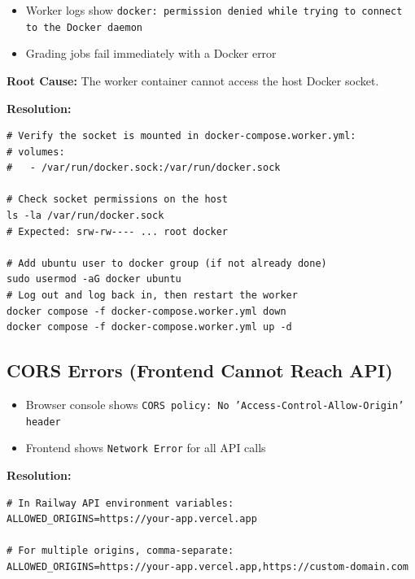 \documentclass[12pt,a4paper]{article}
\begin{document}
\begin{troublebox}[Symptoms]
\begin{itemize}
  \item Worker logs show \texttt{docker: permission denied while trying to connect to the Docker daemon}
  \item Grading jobs fail immediately with a Docker error
\end{itemize}
\end{troublebox}

\textbf{Root Cause:} The worker container cannot access the host Docker socket.

\textbf{Resolution:}

\begin{lstlisting}[style=terminal]
# Verify the socket is mounted in docker-compose.worker.yml:
# volumes:
#   - /var/run/docker.sock:/var/run/docker.sock

# Check socket permissions on the host
ls -la /var/run/docker.sock
# Expected: srw-rw---- ... root docker

# Add ubuntu user to docker group (if not already done)
sudo usermod -aG docker ubuntu
# Log out and log back in, then restart the worker
docker compose -f docker-compose.worker.yml down
docker compose -f docker-compose.worker.yml up -d
\end{lstlisting}

\subsection{CORS Errors (Frontend Cannot Reach API)}

\begin{troublebox}[Symptoms]
\begin{itemize}
  \item Browser console shows \texttt{CORS policy: No 'Access-Control-Allow-Origin' header}
  \item Frontend shows \texttt{Network Error} for all API calls
\end{itemize}
\end{troublebox}

\textbf{Resolution:}

\begin{lstlisting}[style=envfile]
# In Railway API environment variables:
ALLOWED_ORIGINS=https://your-app.vercel.app

# For multiple origins, comma-separate:
ALLOWED_ORIGINS=https://your-app.vercel.app,https://custom-domain.com
\end{lstlisting}
\end{document}
